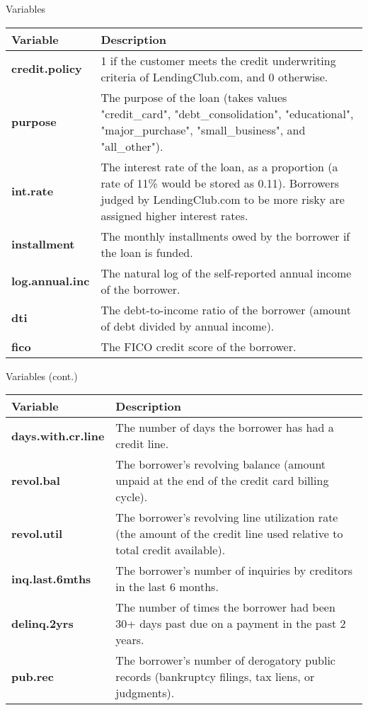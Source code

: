\documentclass[ignorenonframetext,]{beamer}
\begin{document}
\begin{frame}{Variables}

\begin{table}[H]
\centering\begingroup\fontsize{14}{16}\selectfont

\begin{tabular}{>{\bfseries}l||l}
\hline
Variable & Description\\
\hline
credit.policy & 1 if the customer meets the credit underwriting criteria of LendingClub.com, and 0 otherwise.\\
\hline
purpose & The purpose of the loan (takes values "credit\_card", "debt\_consolidation", "educational", "major\_purchase", "small\_business", and "all\_other").\\
\hline
int.rate & The interest rate of the loan, as a proportion (a rate of 11\% would be stored as 0.11). Borrowers judged by LendingClub.com to be more risky are assigned higher interest rates.\\
\hline
installment & The monthly installments owed by the borrower if the loan is funded.\\
\hline
log.annual.inc & The natural log of the self-reported annual income of the borrower.\\
\hline
dti & The debt-to-income ratio of the borrower (amount of debt divided by annual income).\\
\hline
fico & The FICO credit score of the borrower.\\
\hline
\end{tabular}
\endgroup{}
\end{table}

\end{frame}

\begin{frame}{Variables (cont.)}

\begin{table}[H]
\centering\begingroup\fontsize{14}{16}\selectfont

\begin{tabular}{>{\bfseries}l||l}
\hline
Variable & Description\\
\hline
days.with.cr.line & The number of days the borrower has had a credit line.\\
\hline
revol.bal & The borrower's revolving balance (amount unpaid at the end of the credit card billing cycle).\\
\hline
revol.util & The borrower's revolving line utilization rate (the amount of the credit line used relative to total credit available).\\
\hline
inq.last.6mths & The borrower's number of inquiries by creditors in the last 6 months.\\
\hline
delinq.2yrs & The number of times the borrower had been 30+ days past due on a payment in the past 2 years.\\
\hline
pub.rec & The borrower's number of derogatory public records (bankruptcy filings, tax liens, or judgments).\\
\hline
\end{tabular}
\endgroup{}
\end{table}

\end{frame}
\end{document}
